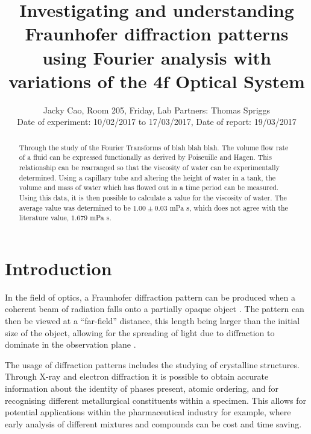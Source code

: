 \documentclass[twocolumn]{revtex4}
\begin{document}
\textheight=26.385cm

\title{Investigating and understanding Fraunhofer diffraction patterns using Fourier analysis with variations of the $\boldsymbol{4f}$ Optical System}
 
\author{Jacky Cao, Room 205, Friday, Lab Partners: Thomas Spriggs \\ Date of experiment: 10/02/2017 to 17/03/2017, Date of report: 19/03/2017}

\begin{abstract}              
Through the study of the Fourier Transforms of blah blah blah. The volume flow rate of a fluid can be expressed functionally as derived by Poiseuille and Hagen. This relationship can be rearranged so that the viscosity of water can be experimentally determined. Using a capillary tube and altering the height of water in a tank, the volume and mass of water which has flowed out in a time period can be measured. Using this data, it is then possible to calculate a value for the viscosity of water. The average value was determined to be $1.00 \pm 0.03$ mPa s, which does not agree with the literature value, $1.679$ mPa s. 
\end{abstract}

\maketitle

\section{Introduction} 
\vspace{-2ex} 

In the field of optics, a Fraunhofer diffraction pattern can be produced when a coherent beam of radiation falls onto a partially opaque object \cite{mathmethods}. The pattern can then be viewed at a ``far-field'' distance, this length being larger than the initial size of the object, allowing for the spreading of light due to diffraction to dominate in the observation plane \cite{of2f}. 

The usage of diffraction patterns includes the studying of crystalline structures. Through X-ray and electron diffraction it is possible to obtain accurate information about the identity of phases present, atomic ordering, and for recognising different metallurgical constituents within a specimen. This allows for potential applications within the pharmaceutical industry for example, where early analysis of different mixtures and compounds can be cost and time saving. \cite{elecdiffraction, xraypharma}
\end{document}
